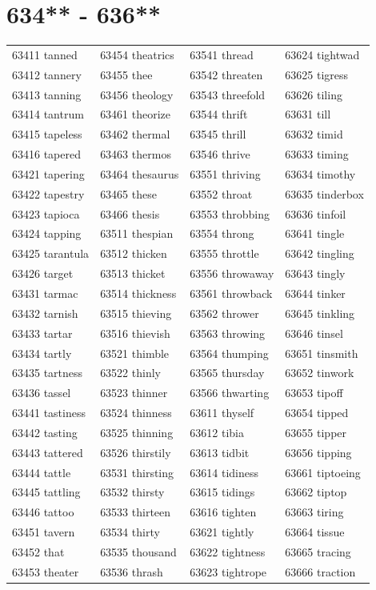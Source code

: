 \documentclass[10pt, oneside]{book}
\begin{document}
\begin{table}
	\centering
	\section*{634** - 636**}
	\begin{tabular}{l l l l}
63411 tanned &63454 theatrics &63541 thread &63624 tightwad\\
63412 tannery &63455 thee &63542 threaten &63625 tigress\\
63413 tanning &63456 theology &63543 threefold &63626 tiling\\
63414 tantrum &63461 theorize &63544 thrift &63631 till\\
63415 tapeless &63462 thermal &63545 thrill &63632 timid\\
63416 tapered &63463 thermos &63546 thrive &63633 timing\\
63421 tapering &63464 thesaurus &63551 thriving &63634 timothy\\
63422 tapestry &63465 these &63552 throat &63635 tinderbox\\
63423 tapioca &63466 thesis &63553 throbbing &63636 tinfoil\\
63424 tapping &63511 thespian &63554 throng &63641 tingle\\
63425 tarantula &63512 thicken &63555 throttle &63642 tingling\\
63426 target &63513 thicket &63556 throwaway &63643 tingly\\
63431 tarmac &63514 thickness &63561 throwback &63644 tinker\\
63432 tarnish &63515 thieving &63562 thrower &63645 tinkling\\
63433 tartar &63516 thievish &63563 throwing &63646 tinsel\\
63434 tartly &63521 thimble &63564 thumping &63651 tinsmith\\
63435 tartness &63522 thinly &63565 thursday &63652 tinwork\\
63436 tassel &63523 thinner &63566 thwarting &63653 tipoff\\
63441 tastiness &63524 thinness &63611 thyself &63654 tipped\\
63442 tasting &63525 thinning &63612 tibia &63655 tipper\\
63443 tattered &63526 thirstily &63613 tidbit &63656 tipping\\
63444 tattle &63531 thirsting &63614 tidiness &63661 tiptoeing\\
63445 tattling &63532 thirsty &63615 tidings &63662 tiptop\\
63446 tattoo &63533 thirteen &63616 tighten &63663 tiring\\
63451 tavern &63534 thirty &63621 tightly &63664 tissue\\
63452 that &63535 thousand &63622 tightness &63665 tracing\\
63453 theater &63536 thrash &63623 tightrope &63666 traction\\
	\end{tabular}
 \end{table}
\clearpage
\end{document}
